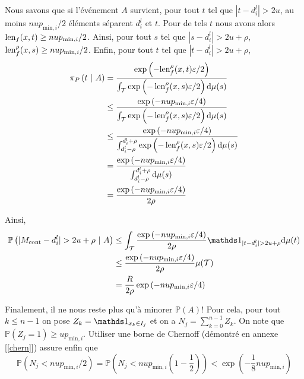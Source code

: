 Nous savons que si l'événement \(A\) survient, pour tout \(t\) tel que \(|t - d_i^l| > 2u\), au moins \(nup_{\text{min}, i}/2\) éléments séparent \(d_i^l\) et \(t\). Pour de tels \(t\) nous avons alors \(\operatorname{len}_f(x,t) \geq nup_{\text{min}, i}/2\). Ainsi, pour tout \(s\) tel que \(|s - d_i^l| > 2u + \rho\), \(\operatorname{len}_f^\rho(x,s) \geq nup_{\text{min}, i}/2\). Enfin, pour tout \(t\) tel que \(|t - d_i^l| > 2u + \rho\),
\begin{align*}
    \pi_P\left( t\ |\ A \right) & = \dfrac{\exp\left( -{\operatorname{len}_f^\rho(x,t)\varepsilon}/{2} \right)}{\int_\mathcal T \exp\left( {-\operatorname{len}_f^\rho(x,s)\varepsilon}/{2} \right)\mathrm{d} \mu(s)}\\
    & \leq \dfrac{\exp\left( -{nup_{\text{min}, i}\varepsilon}/{4} \right)}{\int_\mathcal T \exp\left( {-\operatorname{len}_f^\rho(x,s)\varepsilon}/{2} \right)\mathrm{d} \mu(s)}\\
    & \leq \dfrac{\exp\left( -{nup_{\text{min}, i}\varepsilon}/{4} \right)}{\int_{d_i^l-\rho}^{d_i^l+\rho} \exp\left( {-\operatorname{len}_f^\rho(x,s)\varepsilon}/{2} \right)\mathrm{d} \mu(s)}\\
    & = \dfrac{\exp\left( -{nup_{\text{min}, i}\varepsilon}/{4} \right)}{\int_{d_i^l-\rho}^{d_i^l+\rho}\mathrm{d} \mu(s)}\\
    & = \dfrac{\exp\left( -{nup_{\text{min}, i}\varepsilon}/{4} \right)}{2\rho}\\
\end{align*}

Ainsi,
\begin{align*}
    \mathbb P\left( |M_{\text{cont}} - d_i^l| > 2u + \rho \ | \ A \right) & \leq \int_\mathcal T \dfrac{\exp\left( -{nup_{\text{min}, i}\varepsilon}/{4} \right)}{2\rho}\un_{| t - d_i^l| > 2u + \rho} \dt\mu(t)\\
    & \leq \dfrac{\exp\left( -{nup_{\text{min}, i}\varepsilon}/{4} \right)}{2\rho} \mu(\mathcal T)\\
    & = \dfrac{R}{2\rho}\exp\left( -{nup_{\text{min}, i}\varepsilon}/{4} \right)
\end{align*}


Finalement, il ne nous reste plus qu'à minorer \(\mathbb P (A)\)! Pour cela, pour tout \(k \leq n - 1\) on pose \(Z_k = \un_{x_k \in I_j}\) et on a \(N_j = \sum_{k = 0}^{n-1} Z_k\). On note que \(\mathbb P (Z_j = 1) \geq u p_{\text{min}, i}\). Utiliser une borne de {\sc Chernoff} (démontré en annexe [\ref{chern}]) assure enfin que 
\[
    \mathbb P \left( N_j < n u p_{\text{min}, i}/2\right) = \mathbb P \left( N_j < n u p_{\text{min}, i} \left( 1 - \dfrac{1}{2} \right)\right) < \exp\left( - \dfrac{1}{8}n u p_{\text{min}, i} \right)
\]

